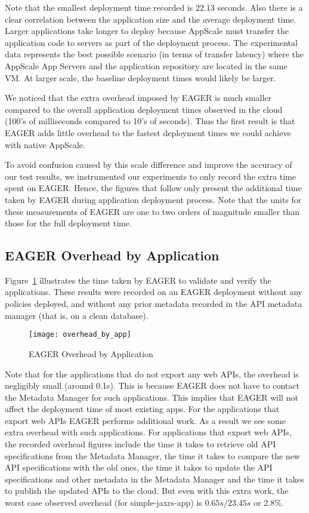 Note that the smallest deployment time recorded is $22.13$ seconds. Also 
there is
a clear correlation between the application size and the average deployment
time. Larger applications take longer to deploy because AppScale must transfer
the application code to servers as part of the deployment
process.  The experimental data represents the best possible scenario (in
terms of transfer latency) where the AppScale App Servers and the application
repository are located in the same VM.  At larger scale, the baseline
deployment times would likely be larger.

We noticed that the extra overhead imposed by EAGER is much smaller compared
to the overall application deployment times observed in the cloud (100's of
milliseconds compared to 10's of seconds).  Thus the first result is that
EAGER adds little overhead to the fastest deployment times we could achieve
with native AppScale.

To avoid confusion
caused by this scale difference and
improve the accuracy of our test results, we instrumented our experiments to
only record the extra time spent on EAGER. 
Hence, the figures that follow only present the additional time taken by EAGER
during application deployment process.  Note that the units for these
measurements of EAGER are one to two
orders of magnitude smaller than those for the
full deployment time.

\subsection{EAGER Overhead by Application}

Figure~\ref{fig:overhead_by_app} illustrates the time taken by EAGER to validate and verify the applications.
These results were recorded on an EAGER deployment without any policies deployed, and without any prior
metadata recorded in the API metadata manager (that is, on a clean database).

\begin{figure}
\centering
\texttt{[image: overhead\_by\_app]}
\caption{EAGER Overhead by Application}
\label{fig:overhead_by_app}
\end{figure}

Note that for the applications that do not export any web APIs, the overhead
is negligibly small (around 0.1s). This is because EAGER does not have to
contact the Metadata Manager for such applications. This implies that EAGER
will not affect the deployment time of most existing apps. For the
applications that export web APIs EAGER performs additional work. As a result
we see some extra overhead with such applications.  For applications that
export web APIs, the recorded overhead figures include the time it takes to
retrieve old API specifications from the Metadata Manager, the time it takes
to compare the new API specifications with the old ones, the time it takes to
update the API specifications and other metadata in the Metadata Manager and
the time it takes to publish the updated APIs to the cloud.  But even with
this extra work, the worst case observed overhead (for simple-jaxrs-app) is
$0.65s / 23.45s$ or 2.8\%.


